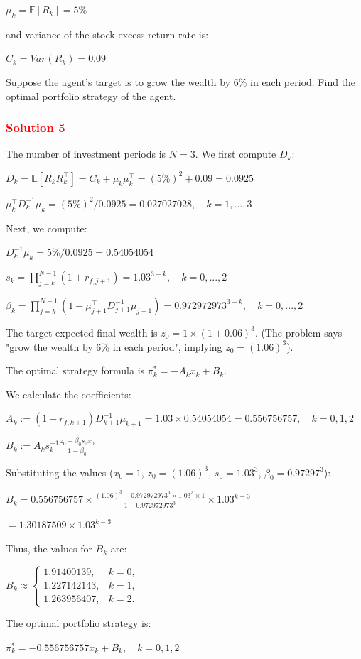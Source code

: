 \centerline{$\mu_{k} = \mathbb{E}[R_{k}] = 5\%$}

and variance of the stock excess return rate is:

\centerline{$C_{k} = Var(R_{k}) = 0.09$}

Suppose the agent's target is to grow the wealth by 6\% in each period. Find the optimal portfolio strategy of the agent.

\subsubsection*{\textcolor{red}{Solution 5}}

The number of investment periods is $N=3$. We first compute $D_k$:

\centerline{$D_{k} = \mathbb{E}[R_{k}R_{k}^{\top}] = C_{k} + \mu_{k}\mu_{k}^{\top} = (5\%)^{2} + 0.09 = 0.0925$}

\centerline{$\mu_{k}^{\top}D_{k}^{-1}\mu_{k} = (5\%)^{2} / 0.0925 = 0.027027028, \quad k=1, ..., 3$}

Next, we compute:

\centerline{$D_{k}^{-1}\mu_{k} = 5\% / 0.0925 = 0.54054054$}

\centerline{$s_{k} = \prod_{j=k}^{N-1}(1+r_{f,j+1}) = 1.03^{3-k}, \quad k=0, ..., 2$}

\centerline{$\beta_{k} = \prod_{j=k}^{N-1}(1-\mu_{j+1}^{\top}D_{j+1}^{-1}\mu_{j+1}) = 0.972972973^{3-k}, \quad k=0, ..., 2$}

The target expected final wealth is $z_0 = 1 \times (1+0.06)^3$. (The problem says "grow the wealth by 6\% in each period", implying $z_0 = (1.06)^3$).

The optimal strategy formula is $\pi_{k}^{*} = -A_{k}x_{k} + B_{k}$.

We calculate the coefficients:

\centerline{$A_{k} := (1+r_{f,k+1})D_{k+1}^{-1}\mu_{k+1} = 1.03 \times 0.54054054 = 0.556756757, \quad k=0, 1, 2$}

\centerline{$B_{k} := A_{k}s_{k}^{-1}\frac{z_{0}-\beta_{0}s_{0}x_{0}}{1-\beta_{0}}$}

Substituting the values ($x_0=1$, $z_0=(1.06)^3$, $s_0=1.03^3$, $\beta_0=0.97297^3$):

\centerline{$B_{k} = 0.556756757 \times \frac{(1.06)^{3} - 0.972972973^{3} \times 1.03^{3} \times 1}{1 - 0.972972973^{3}} \times 1.03^{k-3}$}

\centerline{$= 1.30187509 \times 1.03^{k-3}$}

Thus, the values for $B_k$ are:

\centerline{$B_k \approx \begin{cases} 1.91400139, & k=0, \\ 1.227142143, & k=1, \\ 1.263956407, & k=2. \end{cases}$}

The optimal portfolio strategy is:

\centerline{$\pi_{k}^{*} = -0.556756757 x_{k} + B_{k}, \quad k=0, 1, 2$}